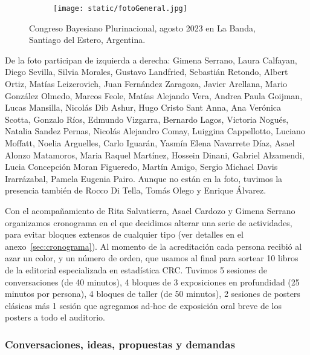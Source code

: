 \documentclass[a4paper,11pt]{book}
\theoremstyle{definition}
\begin{document}

\begin{figure}[!h]
\centering
  \begin{subfigure}[b]{1\textwidth}
  \texttt{[image: static/fotoGeneral.jpg]}
  \end{subfigure}
  \caption{Congreso Bayesiano Plurinacional, agosto 2023 en La Banda, Santiago del Estero, Argentina.}
\end{figure}


De la foto participan de izquierda a derecha: Gimena Serrano, Laura Calfayan, Diego Sevilla, Silvia Morales, Gustavo Landfried, Sebastián Retondo, Albert Ortiz, Matías Leizerovich, Juan Fernández Zaragoza, Javier Arellana, Mario González Olmedo, Marcos Feole, Matías Alejando Vera, Andrea Paula Goijman, Lucas Mansilla, Nicolás Dib Ashur, Hugo Cristo Sant Anna, Ana Verónica Scotta, Gonzalo Ríos, Edmundo Vizgarra, Bernardo Lagos, Victoria Nogués, Natalia Sandez Pernas, Nicolás Alejandro Comay, Luiggina Cappellotto, Luciano Moffatt, Noelia Arguelles, Carlo Iguarán, Yasmín Elena Navarrete Díaz, Asael Alonzo Matamoros, Maria Raquel Martínez, Hossein Dinani, Gabriel Alzamendi, Lucia Concepción Moran Figueredo, Martín Amigo, Sergio Michael Davis Irarrázabal, Pamela Eugenia Pairo.
Aunque no están en la foto, tuvimos la presencia también de Rocco Di Tella, Tomás Olego y Enrique Álvarez.


Con el acompañamiento de Rita Salvatierra, Asael Cardozo y Gimena Serrano organizamos cronograma en el que decidimos alterar una serie de actividades, para evitar bloques extensos de cualquier tipo (ver detalles en el anexo~\ref{sec:cronograma}).
%
Al momento de la acreditación cada persona recibió al azar un color, y un número de orden, que usamos al final para sortear 10 libros de la editorial especializada en estadística CRC.
%
Tuvimos 5 sesiones de conversaciones (de 40 minutos), 4 bloques de 3 exposiciones en profundidad (25 minutos por persona), 4 bloques de taller (de 50 minutos), 2 sesiones de posters clásicas más 1 sesión que agregamos ad-hoc de exposición oral breve de los posters a todo el auditorio.


\subsubsection{Conversaciones, ideas, propuestas y demandas}
\end{document}
